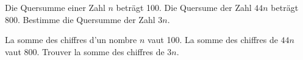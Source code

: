 Die Quersumme einer Zahl $n$ beträgt 100. Die Quersume der Zahl $44n$ beträgt 800. Bestimme die Quersumme der Zahl $3n$.

\bigskip

La somme des chiffres d'un nombre $n$ vaut 100. La somme des chiffres de $44n$ vaut 800. Trouver la somme des chiffres de $3n$.